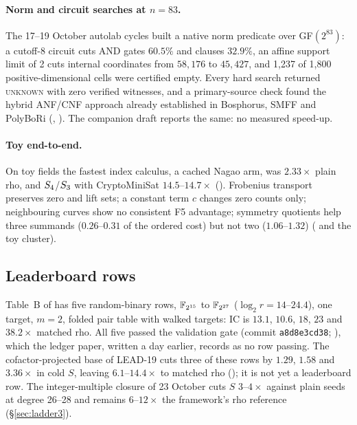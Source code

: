 \paragraph{Norm and circuit searches at $n=83$.} The 17--19 October
autolab cycles built a native norm predicate over GF$(2^{83})$: a cutoff-8
circuit cuts AND gates $60.5\%$ and clauses $32.9\%$, an affine support limit
of 2 cuts internal coordinates from $58{,}176$ to $45{,}427$, and 1{,}237 of
1{,}800 positive-dimensional cells were certified empty. Every hard search
returned \textsc{unknown} with zero verified witnesses, and a primary-source
check found the hybrid ANF/CNF approach already established in Bosphorus,
SMFF and PolyBoRi (,
). The companion draft
 reports the same: no measured speed-up.

\paragraph{Toy end-to-end.} On toy fields the fastest index calculus, a
cached Nagao arm, was $2.33\times$ plain rho, and $S_{4}$/$S_{3}$ with
CryptoMiniSat $14.5$--$14.7\times$ ().
Frobenius transport preserves zero and lift sets; a constant term $c$
changes zero counts only; neighbouring curves show no consistent F5
advantage; symmetry quotients help three summands ($0.26$--$0.31$ of the
ordered cost) but not two ($1.06$--$1.32$)
( and the toy cluster).

\subsection{Leaderboard rows}

Table~B of  has five random-binary rows,
$\mathbb{F}_{2^{15}}$ to $\mathbb{F}_{2^{27}}$ ($\log_2 r=14$--$24.4$), one target, $m=2$,
folded pair table with walked targets: IC is $13.1$, $10.6$, $18$, $23$ and
$38.2\times$ matched rho. All five passed the validation gate
(commit \texttt{a8d8e3cd38}; ),
which the ledger paper, written a day earlier, records as no row passing.
The cofactor-projected base of LEAD-19 cuts three of these rows by
$1.29$, $1.58$ and $3.36\times$ in cold $S$, leaving $6.1$--$14.4\times$ to
matched rho (); it is not yet a
leaderboard row. The integer-multiple closure of 23 October cuts $S$
$3$--$4\times$ against plain seeds at degree 26--28 and remains $6$--$12\times$
the framework's rho reference (\S\ref{sec:ladder3}).

